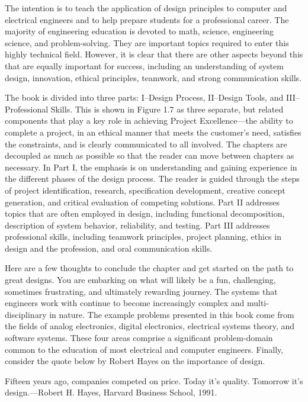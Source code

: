 The intention is to teach the application of design principles to
computer and electrical engineers and to help prepare students for a
professional career. The majority of engineering education is devoted to
math, science, engineering science, and problem-solving. They are
important topics required to enter this highly technical field. However,
it is clear that there are other aspects beyond this that are equally
important for success, including an understanding of system design,
innovation, ethical principles, teamwork, and strong communication
skills.

The book is divided into three parts: I--Design Process, II--Design
Tools, and III--Professional Skills. This is shown in Figure 1.7 as
three separate, but related components that play a key role in achieving
Project Excellence---the ability to complete a project, in an ethical
manner that meets the customer's need, satisfies the constraints, and is
clearly communicated to all involved. The chapters are decoupled as much
as possible so that the reader can move between chapters as necessary.
In Part I, the emphasis is on understanding and gaining experience in
the different phases of the design process. The reader is guided through
the steps of project identification, research, specification
development, creative concept generation, and critical evaluation of
competing solutions. Part II addresses topics that are often employed in
design, including functional decomposition, description of system
behavior, reliability, and testing. Part III addresses professional
skills, including teamwork principles, project planning, ethics in
design and the profession, and oral communication skills.

Here are a few thoughts to conclude the chapter and get started on the
path to great designs. You are embarking on what will likely be a fun,
challenging, sometimes frustrating, and ultimately rewarding journey.
The systems that engineers work with continue to become increasingly
complex and multi-disciplinary in nature. The example problems presented
in this book come from the fields of analog electronics, digital
electronics, electrical systems theory, and software systems. These four
areas comprise a significant problem-domain common to the education of
most electrical and computer engineers. Finally, consider the quote
below by Robert Hayes on the importance of design.

Fifteen years ago, companies competed on price. Today it's quality.
Tomorrow it's design.---Robert H. Hayes, Harvard Business School, 1991.

